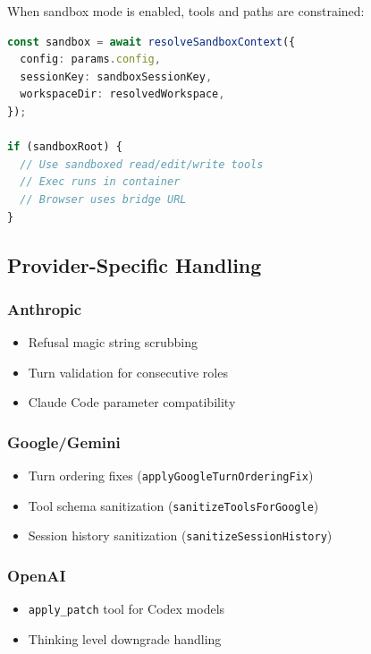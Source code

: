 When sandbox mode is enabled, tools and paths are constrained:

\begin{lstlisting}[language=typescript]
const sandbox = await resolveSandboxContext({
  config: params.config,
  sessionKey: sandboxSessionKey,
  workspaceDir: resolvedWorkspace,
});

if (sandboxRoot) {
  // Use sandboxed read/edit/write tools
  // Exec runs in container
  // Browser uses bridge URL
}
\end{lstlisting}


\subsection{Provider-Specific Handling}


\subsubsection{Anthropic}


\begin{itemize}
  \item Refusal magic string scrubbing
  \item Turn validation for consecutive roles
  \item Claude Code parameter compatibility
\end{itemize}


\subsubsection{Google/Gemini}


\begin{itemize}
  \item Turn ordering fixes (\texttt{applyGoogleTurnOrderingFix})
  \item Tool schema sanitization (\texttt{sanitizeToolsForGoogle})
  \item Session history sanitization (\texttt{sanitizeSessionHistory})
\end{itemize}


\subsubsection{OpenAI}


\begin{itemize}
  \item \texttt{apply\_patch} tool for Codex models
  \item Thinking level downgrade handling
\end{itemize}


